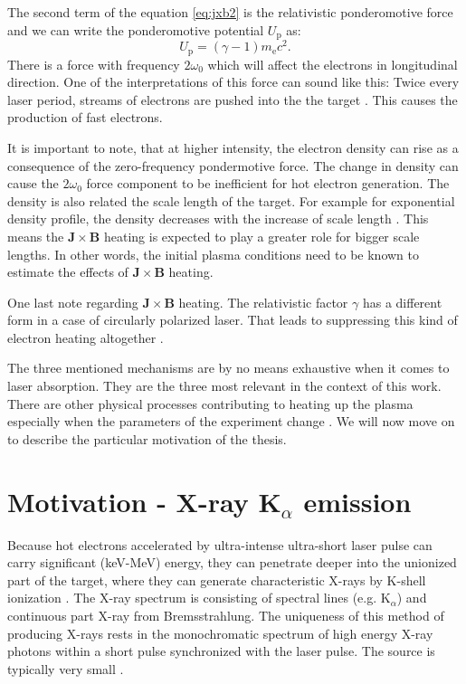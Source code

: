 The second term of the equation \ref{eq:jxb2} is the relativistic ponderomotive force and we can write the ponderomotive potential $U_\mathrm{p}$ as:
\begin{equation}
	U_\mathrm{p} = (\gamma - 1)m_{\mathrm{e}}c^2.
	\label{eq:ponderomotive-potential}
\end{equation}
There is a force with frequency $2\omega_0$ which will affect the electrons in longitudinal direction. One of the interpretations of this force can sound like this: Twice every laser period, streams of electrons are pushed into the the target \cite{cai2006}. This causes the production of fast electrons.

It is important to note, that at higher intensity, the electron density can rise as a consequence of the zero-frequency pondermotive force. The change in density can cause the $2\omega_0$ force component to be inefficient for hot electron generation. The density is also related the scale length of the target. For example for exponential density profile, the density decreases with the increase of scale length \cite{cai2006}. This means the $\bm{J}\times \bm{B}$ heating is expected to play a greater role for bigger scale lengths. In other words, the initial plasma conditions need to be known to estimate the effects of $\bm{J}\times \bm{B}$ heating.

One last note regarding $\bm{J}\times \bm{B}$ heating. The relativistic factor $\gamma$ has a different form in a case of circularly polarized laser. That leads to suppressing this kind of electron heating altogether \cite{cai2006}.


The three mentioned mechanisms are by no means exhaustive when it comes to laser absorption. They are the three most relevant in the context of this work. There are other physical processes contributing to heating up the plasma especially when the parameters of the experiment change \cite{absorption1}. We will now move on to describe the particular motivation of the thesis.

\section{Motivation - X-ray $\mathbf{K}_\alpha$ emission}
Because hot electrons accelerated by ultra-intense ultra-short laser pulse can carry significant (keV-MeV) energy, they can penetrate deeper into the unionized part of the target, where they can generate characteristic X-rays by K-shell ionization \cite{reich2000}. The X-ray spectrum is consisting of spectral lines (e.g. $\mathrm{K}_\alpha$) and continuous part X-ray from Bremsstrahlung. The uniqueness of this method of producing X-rays rests in the monochromatic spectrum of high energy X-ray photons within a short pulse synchronized with the laser pulse. The source is typically very small \cite{pfeifer2006}.

